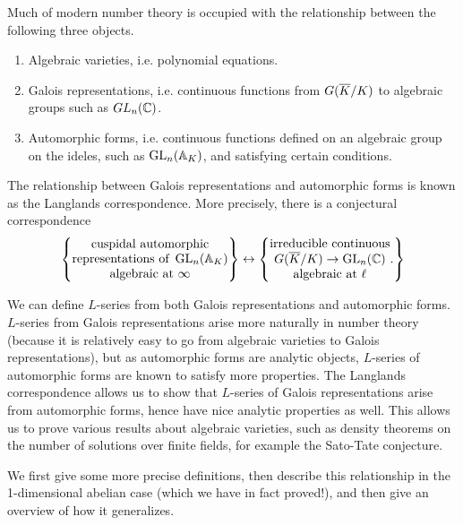 Much of modern number theory is occupied with the relationship between the following three objects.
\begin{enumerate}
\item
Algebraic varieties, i.e. polynomial equations.
\item
Galois representations, i.e. continuous functions from $G(\overline{K}/K)$ to algebraic groups such as $GL_n(\mathbb{C})$.
\item
Automorphic forms, i.e. continuous functions defined on an algebraic group on the ideles, such as $\operatorname{GL}_n(\mathbb{A}_K)$, and satisfying certain conditions.
\end{enumerate}
The relationship between Galois representations and automorphic forms is known as the Langlands correspondence. More precisely, there is a conjectural correspondence
\[
\left\{ {
\begin{matrix}
\text{cuspidal automorphic}\\
\text{representations of }\operatorname{GL}_n(\mathbb{A}_K)\\
\text{algebraic at $\infty$}
\end{matrix}
} \right\}\leftrightarrow
\left\{ {
\begin{matrix}
\text{irreducible continuous}\\
G(\overline{K}/K)\to \operatorname{GL}_n(\mathbb{C})\\
\text{algebraic at }\ell
\end{matrix}.
} \right\}
\]

We can define $L$-series from both Galois representations and automorphic forms. $L$-series from Galois representations arise more naturally in number theory (because it is relatively easy to go from algebraic varieties to Galois representations), but as automorphic forms are analytic objects, $L$-series of automorphic forms are known to satisfy more properties. The Langlands correspondence allows us to show that $L$-series of Galois representations arise from automorphic forms,  hence have nice analytic properties as well. This allows us to prove various results about algebraic varieties, such as density theorems on the number of solutions over finite fields, for example the Sato-Tate conjecture.

We first give some more precise definitions, then describe this relationship in the 1-dimensional abelian case (which we have in fact proved!), and then give an overview of how it generalizes.
